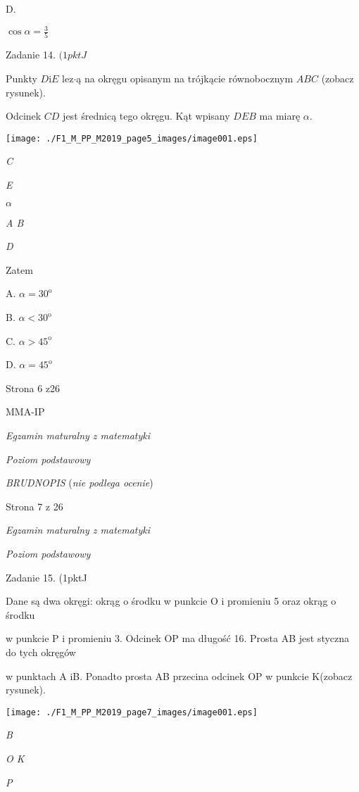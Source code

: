 \documentclass[a4paper,12pt]{article}
\begin{document}
D.

$\displaystyle \cos\alpha=\frac{3}{5}$

Zadanie 14. $(1pktJ$

Punkty $D\mathrm{i}E$ lez$\cdot$ą na okręgu opisanym na trójkącie równobocznym $ABC$ (zobacz rysunek).

Odcinek $CD$ jest średnicą tego okręgu. Kąt wpisany $DEB$ ma miarę $\alpha.$
\begin{center}
\texttt{[image: ./F1\_M\_PP\_M2019\_page5\_images/image001.eps]}
\end{center}
{\it C}

{\it E}

$\alpha$

{\it A  B}

{\it D}

Zatem

A. $\alpha=30^{\mathrm{o}}$

B. $\alpha<30^{\mathrm{o}}$

C. $\alpha>45^{\mathrm{o}}$

D. $\alpha=45^{\mathrm{o}}$

Strona 6 z26

MMA-IP





{\it Egzamin maturalny z matematyki}

{\it Poziom podstawowy}

{\it BRUDNOPIS} ({\it nie podlega ocenie})

Strona 7 z 26





{\it Egzamin maturalny z matematyki}

{\it Poziom podstawowy}

Zadanie 15. (1pktJ

Dane są dwa okręgi: okrąg o środku w punkcie O i promieniu 5 oraz okrąg o środku

w punkcie P i promieniu 3. Odcinek OP ma długość 16. Prosta AB jest styczna do tych okręgów

w punktach A iB. Ponadto prosta AB przecina odcinek OP w punkcie K(zobacz rysunek).
\begin{center}
\texttt{[image: ./F1\_M\_PP\_M2019\_page7\_images/image001.eps]}
\end{center}
{\it B}

{\it O  K}

{\it P}
\end{document}
